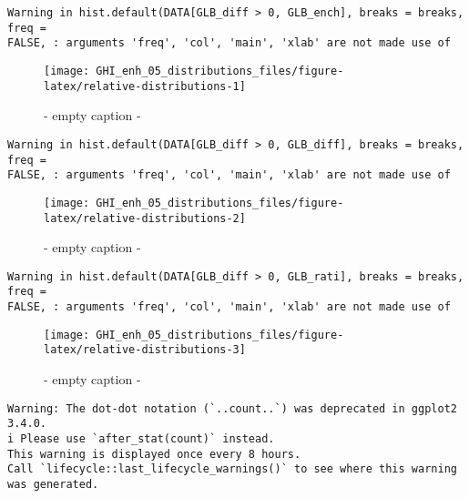 \documentclass[
  10pt,
  a4paper,oneside]{article}
\begin{document}
\begin{verbatim}
Warning in hist.default(DATA[GLB_diff > 0, GLB_ench], breaks = breaks, freq =
FALSE, : arguments 'freq', 'col', 'main', 'xlab' are not made use of
\end{verbatim}

\begin{figure}[H]

{\centering \texttt{[image: GHI\_enh\_05\_distributions\_files/figure-latex/relative-distributions-1]} 

}

\caption{ - empty caption - }\label{fig:relative-distributions-1}
\end{figure}

\begin{verbatim}
Warning in hist.default(DATA[GLB_diff > 0, GLB_diff], breaks = breaks, freq =
FALSE, : arguments 'freq', 'col', 'main', 'xlab' are not made use of
\end{verbatim}

\begin{figure}[H]

{\centering \texttt{[image: GHI\_enh\_05\_distributions\_files/figure-latex/relative-distributions-2]} 

}

\caption{ - empty caption - }\label{fig:relative-distributions-2}
\end{figure}

\begin{verbatim}
Warning in hist.default(DATA[GLB_diff > 0, GLB_rati], breaks = breaks, freq =
FALSE, : arguments 'freq', 'col', 'main', 'xlab' are not made use of
\end{verbatim}

\begin{figure}[H]

{\centering \texttt{[image: GHI\_enh\_05\_distributions\_files/figure-latex/relative-distributions-3]} 

}

\caption{ - empty caption - }\label{fig:relative-distributions-3}
\end{figure}

\begin{verbatim}
Warning: The dot-dot notation (`..count..`) was deprecated in ggplot2 3.4.0.
i Please use `after_stat(count)` instead.
This warning is displayed once every 8 hours.
Call `lifecycle::last_lifecycle_warnings()` to see where this warning was generated.
\end{verbatim}
\end{document}
